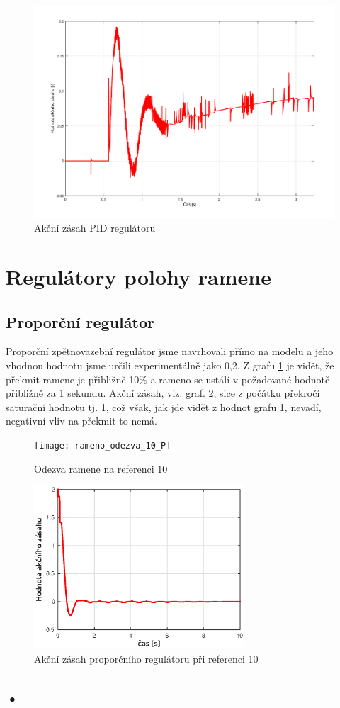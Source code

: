 \documentclass[11pt,a4paper]{article}
\begin{document}
\begin{figure}[H]
	\centering
    \includegraphics[scale=0.55]{odezva_kyvadlo_PID_akcnizasah}
    \caption{Akční zásah PID regulátoru}
\end{figure}


\section{Regulátory polohy ramene}

\subsection{Proporční regulátor}

Proporční zpětnovazební regulátor jsme navrhovali přímo na modelu a jeho vhodnou hodnotu jsme určili experimentálně jako 0,2. Z grafu \ref{ram_p_odz} je vidět, že překmit ramene je přibližně 10\% a rameno se ustálí v požadované hodnotě přibližně za 1 sekundu. Akční zásah, viz. graf. \ref{ram_p_akc}, sice z počátku překročí saturační hodnotu tj. 1, což však, jak jde vidět z hodnot grafu \ref{ram_p_odz}, nevadí, negativní vliv na překmit to nemá.

\begin{figure}[H]
\centering
\texttt{[image: rameno\_odezva\_10\_P]}
\caption{Odezva ramene na referenci 10}
\label{ram_p_odz}
\end{figure}

\begin{figure}[H]
\centering
\includegraphics[width=0.7\textwidth]{rameno_odezva_10_P_akcnizasah}
\caption{Akční zásah proporčního regulátoru při referenci 10}
\label{ram_p_akc}
\end{figure}

\subsection{•}
\end{document}
